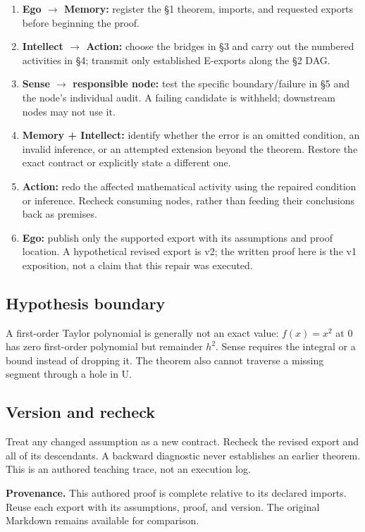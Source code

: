 \documentclass[preprint,12pt,aps,pra,showkeys,amsmath,amssymb,superscriptaddress,floatfix]{revtex4-2}
\theoremstyle{definition}
\theoremstyle{remark}
\providecommand{\tightlist}{\setlength{\itemsep}{2pt}\setlength{\parskip}{0pt}}
\begin{document}
\begin{enumerate}
\def\labelenumi{\arabic{enumi}.}
\tightlist
\item
  \textbf{Ego \(\to\) Memory:} register the §1 theorem, imports, and
  requested exports before beginning the proof.
\item
  \textbf{Intellect \(\to\) Action:} choose the bridges in §3 and carry
  out the numbered activities in §4; transmit only established E-exports
  along the §2 DAG.
\item
  \textbf{Sense \(\to\) responsible node:} test the specific
  boundary/failure in §5 and the node's individual audit. A failing
  candidate is withheld; downstream nodes may not use it.
\item
  \textbf{Memory + Intellect:} identify whether the error is an omitted
  condition, an invalid inference, or an attempted extension beyond the
  theorem. Restore the exact contract or explicitly state a different
  one.
\item
  \textbf{Action:} redo the affected mathematical activity using the
  repaired condition or inference. Recheck consuming nodes, rather than
  feeding their conclusions back as premises.
\item
  \textbf{Ego:} publish only the supported export with its assumptions
  and proof location. A hypothetical revised export is v2; the written
  proof here is the v1 exposition, not a claim that this repair was
  executed.
\end{enumerate}

\subsection{Hypothesis boundary}
A first-order Taylor polynomial is generally not an exact value:
\(f(x)=x^{2}\) at 0 has zero first-order polynomial but remainder
\(h^{2}\). Sense requires the integral or a bound instead of dropping
it. The theorem also cannot traverse a missing segment through a hole in
U.

\subsection{Version and recheck}
Treat any changed assumption as a new contract. Recheck the revised
export and all of its descendants. A backward diagnostic never
establishes an earlier theorem. This is an authored teaching trace, not
an execution log.

\par\medskip\begingroup\small\linespread{1.0}\selectfont\noindent\textbf{Provenance.} This authored proof is complete relative to its declared imports. Reuse
each export with its assumptions, proof, and version. The original
Markdown remains available for comparison.
\par\endgroup
\end{document}
